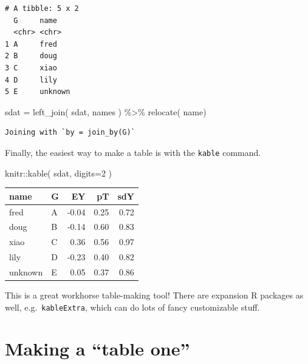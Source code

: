\documentclass[
  letterpaper,
  DIV=11,
  numbers=noendperiod]{scrreprt}
\newenvironment{Shaded}{\begin{snugshade}}{\end{snugshade}}
\newcommand{\AttributeTok}[1]{\textcolor[rgb]{0.49,0.56,0.16}{#1}}
\newcommand{\DecValTok}[1]{\textcolor[rgb]{0.25,0.63,0.44}{#1}}
\newcommand{\FunctionTok}[1]{\textcolor[rgb]{0.02,0.16,0.49}{#1}}
\newcommand{\NormalTok}[1]{\textcolor[rgb]{0.00,0.44,0.13}{#1}}
\newcommand{\OtherTok}[1]{\textcolor[rgb]{0.00,0.44,0.13}{#1}}
\newcommand{\SpecialCharTok}[1]{\textcolor[rgb]{0.25,0.44,0.63}{#1}}
\begin{document}
\begin{verbatim}
# A tibble: 5 x 2
  G     name   
  <chr> <chr>  
1 A     fred   
2 B     doug   
3 C     xiao   
4 D     lily   
5 E     unknown
\end{verbatim}

\begin{Shaded}
\begin{Highlighting}[]
\NormalTok{sdat }\OtherTok{=} \FunctionTok{left\_join}\NormalTok{( sdat, names ) }\SpecialCharTok{\%\textgreater{}\%}
    \FunctionTok{relocate}\NormalTok{( name)}
\end{Highlighting}
\end{Shaded}

\begin{verbatim}
Joining with `by = join_by(G)`
\end{verbatim}

Finally, the easiest way to make a table is with the \texttt{kable}
command.

\begin{Shaded}
\begin{Highlighting}[]
\NormalTok{knitr}\SpecialCharTok{::}\FunctionTok{kable}\NormalTok{( sdat, }\AttributeTok{digits=}\DecValTok{2}\NormalTok{ )}
\end{Highlighting}
\end{Shaded}

\begin{longtable}[]{@{}llrrr@{}}
\toprule\noalign{}
name & G & EY & pT & sdY \\
\midrule\noalign{}
\endhead
\bottomrule\noalign{}
\endlastfoot
fred & A & -0.04 & 0.25 & 0.72 \\
doug & B & -0.14 & 0.60 & 0.83 \\
xiao & C & 0.36 & 0.56 & 0.97 \\
lily & D & -0.23 & 0.40 & 0.82 \\
unknown & E & 0.05 & 0.37 & 0.86 \\
\end{longtable}

This is a great workhorse table-making tool! There are expansion R
packages as well, e.g.~\texttt{kableExtra}, which can do lots of fancy
customizable stuff.

\hypertarget{making-a-table-one}{%
\section{Making a ``table one''}\label{making-a-table-one}}
\end{document}
